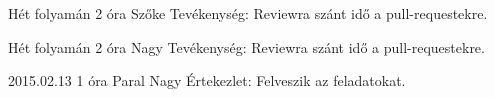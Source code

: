\begin{naplo}
\bejegyzes
{Hét folyamán}
{2 óra}
{Szőke} 
{Tevékenység: Reviewra szánt idő a pull-requestekre.\newline } 

\bejegyzes
{Hét folyamán}
{2 óra}
{Nagy} 
{Tevékenység: Reviewra szánt idő a pull-requestekre.\newline } 

\bejegyzes
{2015.02.13}
{1 óra}
{Paral \newline Nagy} 
{Értekezlet: Felveszik az feladatokat.\newline } 


\end{naplo}

